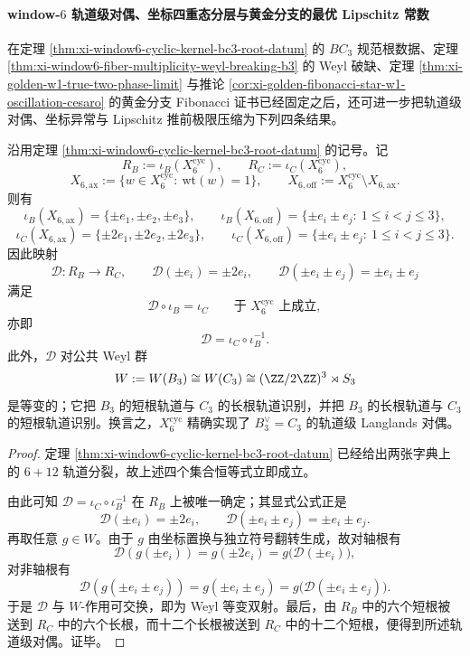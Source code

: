 \paragraph{window-\texorpdfstring{$6$}{6} 轨道级对偶、坐标四重态分层与黄金分支的最优 Lipschitz 常数}
在定理 \ref{thm:xi-window6-cyclic-kernel-bc3-root-datum} 的 \(BC_3\) 规范根数据、定理 \ref{thm:xi-window6-fiber-multiplicity-weyl-breaking-b3} 的 Weyl 破缺、定理 \ref{thm:xi-golden-w1-true-two-phase-limit} 与推论 \ref{cor:xi-golden-fibonacci-star-w1-oscillation-cesaro} 的黄金分支 Fibonacci 证书已经固定之后，还可进一步把轨道级对偶、坐标异常与 Lipschitz 推前极限压缩为下列四条结果。

\begin{theorem}[window-\texorpdfstring{$6$}{6} 的 \texorpdfstring{$X_6^{\mathrm{cyc}}$}{X6cyc} 实现 \texorpdfstring{$B_3^\vee=C_3$}{B3v=C3} 的轨道级 Langlands 对偶]\label{thm:xi-window6-b3c3-orbitwise-langlands-duality}
沿用定理 \ref{thm:xi-window6-cyclic-kernel-bc3-root-datum} 的记号。记
\[
R_B:=\iota_B(X_6^{\mathrm{cyc}}),
\qquad
R_C:=\iota_C(X_6^{\mathrm{cyc}}),
\]
\[
X_{6,\mathrm{ax}}
:=
\{w\in X_6^{\mathrm{cyc}}:\ \mathrm{wt}(w)=1\},
\qquad
X_{6,\mathrm{off}}
:=
X_6^{\mathrm{cyc}}\setminus X_{6,\mathrm{ax}}.
\]
则有
\[
\iota_B(X_{6,\mathrm{ax}})
=
\{\pm e_1,\pm e_2,\pm e_3\},
\qquad
\iota_B(X_{6,\mathrm{off}})
=
\{\pm e_i\pm e_j:\ 1\le i<j\le 3\},
\]
\[
\iota_C(X_{6,\mathrm{ax}})
=
\{\pm 2e_1,\pm 2e_2,\pm 2e_3\},
\qquad
\iota_C(X_{6,\mathrm{off}})
=
\{\pm e_i\pm e_j:\ 1\le i<j\le 3\}.
\]
因此映射
\[
\mathcal D:R_B\to R_C,
\qquad
\mathcal D(\pm e_i)=\pm 2e_i,
\qquad
\mathcal D(\pm e_i\pm e_j)=\pm e_i\pm e_j
\]
满足
\[
\mathcal D\circ \iota_B=\iota_C
\qquad\text{于 }X_6^{\mathrm{cyc}}\text{ 上成立},
\]
亦即
\[
\mathcal D=\iota_C\circ \iota_B^{-1}.
\]
此外，\(\mathcal D\) 对公共 Weyl 群
\[
W:=W(B_3)\cong W(C_3)\cong (\ZZ/2\ZZ)^3\rtimes S_3
\]
是等变的；它把 \(B_3\) 的短根轨道与 \(C_3\) 的长根轨道识别，并把 \(B_3\) 的长根轨道与 \(C_3\) 的短根轨道识别。换言之，\(X_6^{\mathrm{cyc}}\) 精确实现了 \(B_3^\vee=C_3\) 的轨道级 Langlands 对偶。
\end{theorem}
\begin{proof}
定理 \ref{thm:xi-window6-cyclic-kernel-bc3-root-datum} 已经给出两张字典上的 \(6+12\) 轨道分裂，故上述四个集合恒等式立即成立。

由此可知 \(\mathcal D=\iota_C\circ \iota_B^{-1}\) 在 \(R_B\) 上被唯一确定；其显式公式正是
\[
\mathcal D(\pm e_i)=\pm 2e_i,
\qquad
\mathcal D(\pm e_i\pm e_j)=\pm e_i\pm e_j.
\]
再取任意 \(g\in W\)。由于 \(g\) 由坐标置换与独立符号翻转生成，故对轴根有
\[
\mathcal D(g(\pm e_i))
=
g(\pm 2e_i)
=
g\bigl(\mathcal D(\pm e_i)\bigr),
\]
对非轴根有
\[
\mathcal D(g(\pm e_i\pm e_j))
=
g(\pm e_i\pm e_j)
=
g\bigl(\mathcal D(\pm e_i\pm e_j)\bigr).
\]
于是 \(\mathcal D\) 与 \(W\)-作用可交换，即为 Weyl 等变双射。最后，由 \(R_B\) 中的六个短根被送到 \(R_C\) 中的六个长根，而十二个长根被送到 \(R_C\) 中的十二个短根，便得到所述轨道级对偶。证毕。
\end{proof}

